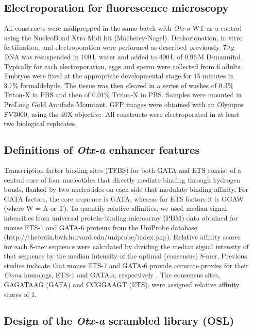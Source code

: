 \subsection{Electroporation for fluorescence microscopy}

All constructs were midiprepped in the same batch with \textit{Otx-a} WT as a control using the NucleoBond Xtra Midi kit (Macherey-Nagel). Dechorionation, in vitro fertilization, and electroporation were performed as described previously\cite{Farley2016-eh}. 70\,\textmu g DNA was resuspended in 100\,\textmu L water and added to 400\,\textmu L of 0.96\,M D-mannitol. Typically for each electroporation, eggs and sperm were collected from 6 adults. Embryos were fixed at the appropriate developmental stage for 15 minutes in 3.7\% formaldehyde. The tissue was then cleared in a series of washes of 0.3\% Triton-X in PBS and then of 0.01\% Triton-X in PBS. Samples were mounted in ProLong Gold Antifade Mountant. GFP images were obtained with an Olympus FV3000, using the 40X objective. All constructs were electroporated in at least two biological replicates.

\subsection{Definitions of \textit{Otx-a} enhancer features}

Transcription factor binding sites (TFBS) for both GATA and ETS consist of a central core of four nucleotides that directly mediate binding through hydrogen bonds, flanked by two nucleotides on each side that modulate binding affinity. For GATA factors, the core sequence is GATA, whereas for ETS factors it is GGAW (where W = A or T). To quantify relative affinities, we used median signal intensities from universal protein-binding microarray (PBM) data obtained for mouse ETS-1\cite{Wei2010-di} and GATA-6\cite{Badis2009-hv} proteins from the UniProbe database (http://thebrain.bwh.harvard.edu/uniprobe/index.php)\cite{Hume2015-xj}. Relative affinity scores for each 8-mer sequence were calculated by dividing the median signal intensity of that sequence by the median intensity of the optimal (consensus) 8-mer. Previous studies indicate that mouse ETS-1 and GATA-6 provide accurate proxies for their \textit{Ciona} homologs, ETS-1 and GATA.a, respectively \cite{Farley2015-xx,Nitta2015-rt,Wei2010-di}. The consensus sites, GAGATAAG (GATA) and CCGGAAGT (ETS), were assigned relative affinity scores of 1.

\subsection{Design of the \textit{Otx-a} scrambled library (OSL)}


